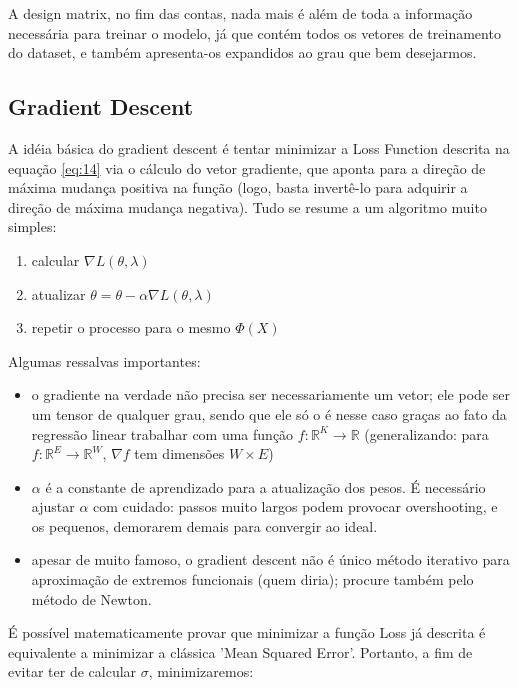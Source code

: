 \documentclass{article}
\begin{document}
A design matrix, no fim das contas, nada mais é além de
toda a informação necessária para treinar o modelo, já
que contém todos os vetores de treinamento do dataset, e
também apresenta-os expandidos ao grau que bem desejarmos.

\subsection{Gradient Descent}

A idéia básica do gradient descent é tentar minimizar a 
Loss Function descrita na equação \ref{eq:14} via o cálculo
do vetor gradiente, que aponta para a direção de máxima mudança
positiva na função (logo, basta invertê-lo para adquirir a 
direção de máxima mudança negativa). Tudo se resume a um
algoritmo muito simples:

\begin{enumerate}
    \item calcular $\nabla L(\theta,\lambda)$
    \item atualizar $\theta = \theta - \alpha
    \nabla L(\theta,\lambda)$
    \item repetir o processo para o mesmo $\Phi(X)$
\end{enumerate}

Algumas ressalvas importantes: 

\begin{itemize}
    \item o gradiente na verdade não 
    precisa ser necessariamente um vetor; ele pode ser um tensor
    de qualquer grau, sendo que ele só o é nesse caso graças 
    ao fato da regressão linear trabalhar com uma função
    $f:\mathbb{R}^{K} \rightarrow \mathbb{R}$ (generalizando:
    para $f:\mathbb{R}^{E} \rightarrow \mathbb{R}^{W}$,
    $\nabla f$ tem dimensões $W \times E$)
    \item $\alpha$ é a constante de aprendizado para a 
    atualização dos pesos. É necessário ajustar $\alpha$ com 
    cuidado: passos muito largos podem provocar overshooting,
    e os pequenos, demorarem demais para convergir ao ideal.
    \item apesar de muito famoso, o gradient descent não é
    único método iterativo para aproximação de extremos funcionais
    (quem diria); procure também pelo método de Newton.
\end{itemize}

É possível matematicamente provar que minimizar a função Loss já
descrita é equivalente a minimizar a clássica 'Mean Squared Error'.
Portanto, a fim de evitar ter de calcular $\sigma$, minimizaremos:
\end{document}
